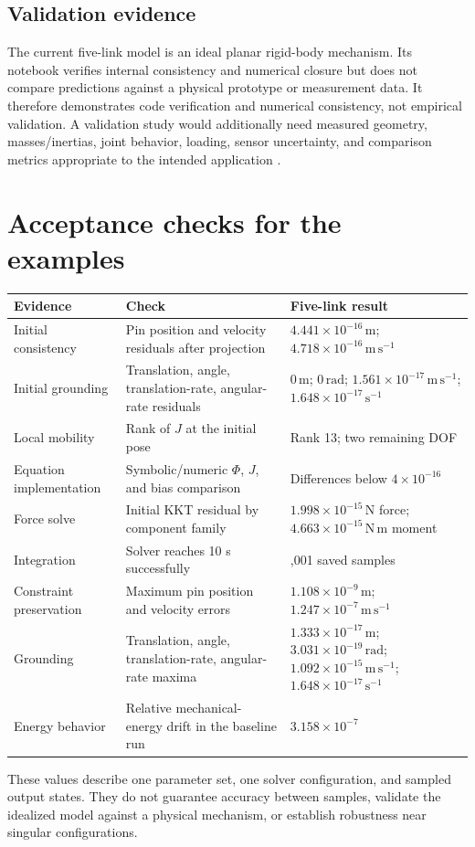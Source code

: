 \documentclass[../main.tex]{subfiles}
\begin{document}
\subsection{Validation evidence}
The current five-link model is an ideal planar rigid-body mechanism. Its notebook verifies internal consistency and numerical closure but does not compare predictions against a physical prototype or measurement data. It therefore demonstrates code verification and numerical consistency, not empirical validation. A validation study would additionally need measured geometry, masses/inertias, joint behavior, loading, sensor uncertainty, and comparison metrics appropriate to the intended application \cite{oberkampfroy2010}.

\section{Acceptance checks for the examples}
\begin{center}
\small
\begin{tabular}{@{}>{\raggedright\arraybackslash}p{}>{\raggedright\arraybackslash}p{}>{\raggedright\arraybackslash}p{}@{}}
\toprule
Evidence & Check & Five-link result \\
\midrule
Initial consistency & Pin position and velocity residuals after projection & \(4.441\times10^{-16}\,\mathrm m\); \(4.718\times10^{-16}\,\mathrm{m\,s^{-1}}\) \\
Initial grounding & Translation, angle, translation-rate, angular-rate residuals & \(0\,\mathrm m\); \(0\,\mathrm{rad}\); \(1.561\times10^{-17}\,\mathrm{m\,s^{-1}}\); \(1.648\times10^{-17}\,\mathrm{s^{-1}}\) \\
Local mobility & Rank of \(J\) at the initial pose & Rank 13; two remaining DOF \\
Equation implementation & Symbolic/numeric \(\Phi\), \(J\), and bias comparison & Differences below \(4\times10^{-16}\) \\
Force solve & Initial KKT residual by component family & \(1.998\times10^{-15}\,\mathrm N\) force; \(4.663\times10^{-15}\,\mathrm{N\,m}\) moment \\
Integration & Solver reaches 10 s successfully & 2,001 saved samples \\
Constraint preservation & Maximum pin position and velocity errors & \(1.108\times10^{-9}\,\mathrm m\); \(1.247\times10^{-7}\,\mathrm{m\,s^{-1}}\) \\
Grounding & Translation, angle, translation-rate, angular-rate maxima & \(1.333\times10^{-17}\,\mathrm m\); \(3.031\times10^{-19}\,\mathrm{rad}\); \(1.092\times10^{-15}\,\mathrm{m\,s^{-1}}\); \(1.648\times10^{-17}\,\mathrm{s^{-1}}\) \\
Energy behavior & Relative mechanical-energy drift in the baseline run & \(3.158\times10^{-7}\) \\
\bottomrule
\end{tabular}
\end{center}
These values describe one parameter set, one solver configuration, and sampled output states. They do not guarantee accuracy between samples, validate the idealized model against a physical mechanism, or establish robustness near singular configurations.
\end{document}
